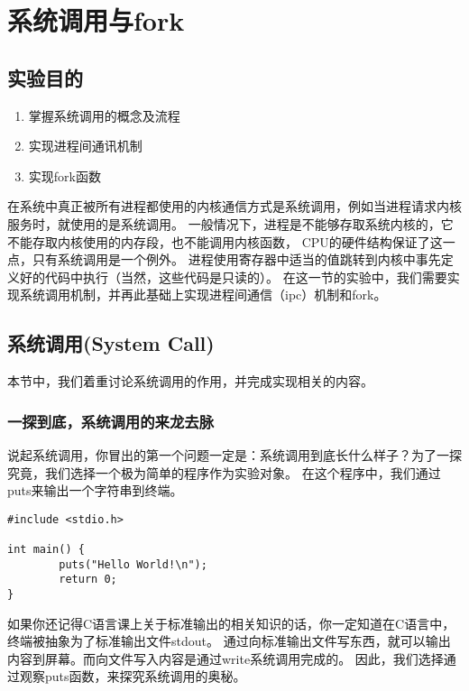 \chapter{系统调用与fork}

\section{实验目的}
  \begin{enumerate}
    \item 掌握系统调用的概念及流程
    \item 实现进程间通讯机制
    \item 实现fork函数
  \end{enumerate}

在系统中真正被所有进程都使用的内核通信方式是系统调用，例如当进程请求内核服务时，就使用的是系统调用。
一般情况下，进程是不能够存取系统内核的，它不能存取内核使用的内存段，也不能调用内核函数，
CPU的硬件结构保证了这一点，只有系统调用是一个例外。
进程使用寄存器中适当的值跳转到内核中事先定义好的代码中执行（当然，这些代码是只读的）。
在这一节的实验中，我们需要实现系统调用机制，并再此基础上实现进程间通信（ipc）机制和fork。

\section{系统调用(System Call)}
本节中，我们着重讨论系统调用的作用，并完成实现相关的内容。

\subsection{一探到底，系统调用的来龙去脉}
说起系统调用，你冒出的第一个问题一定是：系统调用到底长什么样子？为了一探究竟，我们选择一个极为简单的程序作为实验对象。
在这个程序中，我们通过puts来输出一个字符串到终端。

\begin{verbatim}
#include <stdio.h>

int main() {
        puts("Hello World!\n");
        return 0;
}
\end{verbatim}

\begin{note}
如果你还记得C语言课上关于标准输出的相关知识的话，你一定知道在C语言中，终端被抽象为了标准输出文件stdout。
通过向标准输出文件写东西，就可以输出内容到屏幕。而向文件写入内容是通过write系统调用完成的。
因此，我们选择通过观察puts函数，来探究系统调用的奥秘。
\end{note}

